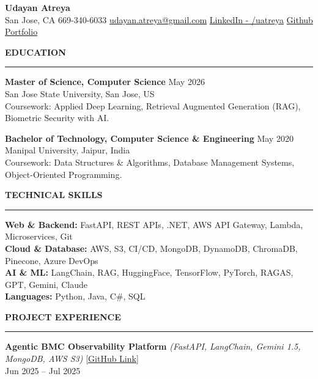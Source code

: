 \documentclass[letterpaper,10.5pt]{extarticle}
\newcommand{\resumesection}[1]{%
    \vspace{6pt}%
    \noindent\textbf{#1}\vspace{-5pt}%
    \\\noindent\rule{\textwidth}{0.5pt}%
    \vspace{1pt}%
}
\begin{document}
\begin{center}
    {\LARGE\textbf{Udayan Atreya}}\\[3pt]
    {\fontsize{11}{13.2}\selectfont
    San Jose, CA \textbar{} 669-340-6033 \textbar{}
    \href{mailto:udayan.atreya@gmail.com}{udayan.atreya@gmail.com} \textbar{}
    \href{https://www.linkedin.com/in/uatreya/}{LinkedIn - /uatreya} \textbar{}
    \href{https://github.com/slowloris-98/}{Github} \textbar{}
    \href{https://udayan-atreya.vercel.app/}{Portfolio}}
\end{center}

\resumesection{EDUCATION}

\noindent\textbf{Master of Science, Computer Science} \hfill May 2026\\
San Jose State University, San Jose, US\\
Coursework: Applied Deep Learning, Retrieval Augmented Generation (RAG), Biometric Security with AI.

\vspace{5pt}

\noindent\textbf{Bachelor of Technology, Computer Science \& Engineering} \hfill May 2020\\
Manipal University, Jaipur, India\\
Coursework: Data Structures \& Algorithms, Database Management Systems, Object-Oriented Programming.

\resumesection{TECHNICAL SKILLS}

\noindent\textbf{Web \& Backend:} FastAPI, REST APIs, .NET, AWS API Gateway, Lambda, Microservices, Git\\
\noindent\textbf{Cloud \& Database:} AWS, S3, CI/CD, MongoDB, DynamoDB, ChromaDB, Pinecone, Azure DevOps\\
\noindent\textbf{AI \& ML:} LangChain, RAG, HuggingFace, TensorFlow, PyTorch, RAGAS, GPT, Gemini, Claude\\
\noindent\textbf{Languages:} Python, Java, C\#, SQL

\resumesection{PROJECT EXPERIENCE}

\noindent\textbf{Agentic BMC Observability Platform}
\textit{(FastAPI, LangChain, Gemini 1.5, MongoDB, AWS S3)} \hfill \href{https://github.com/slowloris-98/Agentic-Oberservability-BMC}{[GitHub Link]} \\
Jun 2025 -- Jul 2025
\end{document}
